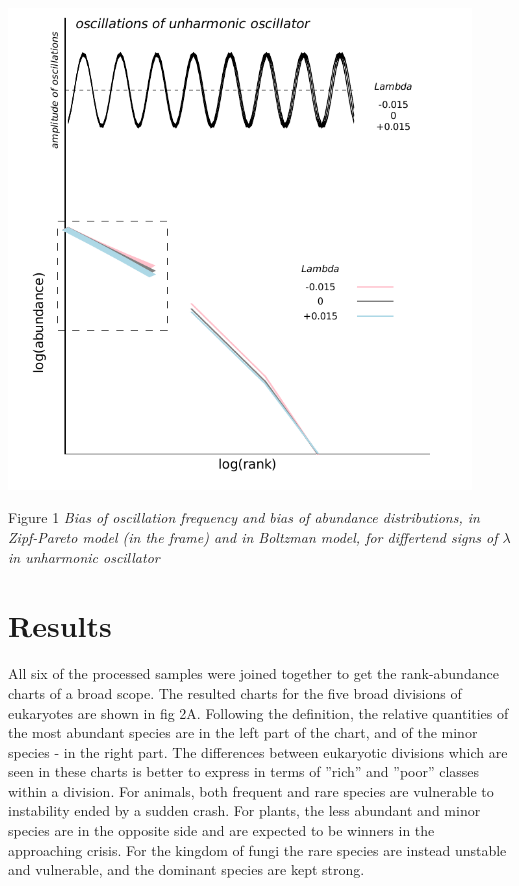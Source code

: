 \documentclass[a4paper]{article}
\begin{document}
\includegraphics[width=0.92\textwidth]{rankabundance_unharmonic.jpg}

Figure 1 \textit{Bias of oscillation frequency and bias of abundance distributions, in Zipf-Pareto model (in the frame) and in Boltzman model, for differtend signs of $\lambda$ in unharmonic oscillator}


\section*{Results} 


All six of the processed samples were joined together to get the rank-abundance charts of a broad scope. The resulted charts for the five broad divisions of eukaryotes are shown in fig 2A. Following the definition, the relative quantities of the most abundant species are in the left part of the chart, and of the minor species - in the right part. The differences between eukaryotic divisions which are seen in these charts is better to express in terms of ''rich'' and ''poor'' classes within a division. For animals, both frequent and rare species are vulnerable to instability ended by a sudden crash. For plants, the less abundant and minor species are in the opposite side and are expected to be winners in the approaching crisis. For the kingdom of fungi the rare species are instead unstable and vulnerable, and the dominant species are kept strong.   
\end{document}
